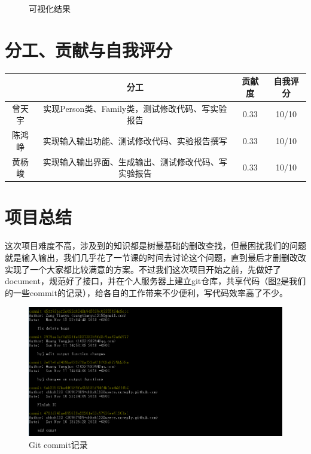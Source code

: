 \documentclass[12pt,UTF8]{ctexart}
\begin{document}
\begin{spacing}{1.4}
\begin{figure}[htbp]
\caption{可视化结果}
\label{fig:visualization}
\end{figure}


\section{分工、贡献与自我评分}
\begin{table}[H]
	\centering
	\begin{tabular}{|c|c|c|c|}
		\hline
		& 分工 & 贡献度 & 自我评分\\
		\hline
		曾天宇 & 实现Person类、Family类，测试修改代码、写实验报告 & 0.33 & 10/10\\
		陈鸿峥 & 实现输入输出功能、测试修改代码、实验报告撰写 & 0.33 & 10/10\\
		黄杨峻 & 实现输入输出界面、生成输出、测试修改代码、写实验报告 & 0.33 & 10/10\\
		\hline
	\end{tabular}
\end{table}

\section{项目总结}
这次项目难度不高，涉及到的知识都是树最基础的删改查找，但最困扰我们的问题就是输入输出，我们几乎花了一节课的时间去讨论这个问题，直到最后才删删改改实现了一个大家都比较满意的方案。不过我们这次项目开始之前，先做好了document，规范好了接口，并在个人服务器上建立git仓库，共享代码（图\ref{fig:git}是我们的一些commit的记录），给各自的工作带来不少便利，写代码效率高了不少。
\begin{figure}[htbp]
\centering
\includegraphics[width=\linewidth]{fig/git.PNG}
\caption{Git commit记录}
\label{fig:git}
\end{figure}

\end{spacing}

%	
\end{document}
